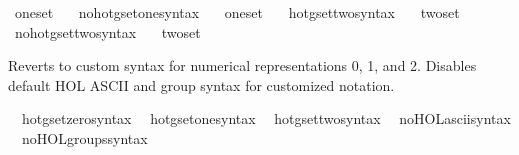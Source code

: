 \begin{isabellebody}
\ one{\isacharunderscore}{\kern0pt}set\ {\isacharparenleft}{\kern0pt}{\isachardoublequoteopen}{}{\isachardoublequoteclose}{\isacharparenright}{\kern0pt}\ \isamarkupfalse%
\isanewline
{}\isamarkupfalse%
\ no{\isacharunderscore}{\kern0pt}hotg{\isacharunderscore}{\kern0pt}set{\isacharunderscore}{\kern0pt}one{\isacharunderscore}{\kern0pt}syntax\ \ \isamarkupfalse%
\ one{\isacharunderscore}{\kern0pt}set\ {\isacharparenleft}{\kern0pt}{\isachardoublequoteopen}{}{\isachardoublequoteclose}{\isacharparenright}{\kern0pt}\ \isamarkupfalse%
\isanewline
\isanewline
{}\isamarkupfalse%
\ hotg{\isacharunderscore}{\kern0pt}set{\isacharunderscore}{\kern0pt}two{\isacharunderscore}{\kern0pt}syntax\ \ \isamarkupfalse%
\ two{\isacharunderscore}{\kern0pt}set\ {\isacharparenleft}{\kern0pt}{\isachardoublequoteopen}{}{\isachardoublequoteclose}{\isacharparenright}{\kern0pt}\ \isamarkupfalse%
\isanewline
{}\isamarkupfalse%
\ no{\isacharunderscore}{\kern0pt}hotg{\isacharunderscore}{\kern0pt}set{\isacharunderscore}{\kern0pt}two{\isacharunderscore}{\kern0pt}syntax\ \ \isamarkupfalse%
\ two{\isacharunderscore}{\kern0pt}set\ {\isacharparenleft}{\kern0pt}{\isachardoublequoteopen}{}{\isachardoublequoteclose}{\isacharparenright}{\kern0pt}\ \isamarkupfalse%
%
\begin{isamarkuptext}%
Reverts to custom syntax for numerical representations 0, 1, and 2.
      Disables default HOL ASCII and group syntax for customized notation.%
\end{isamarkuptext}\isamarkuptrue%
\isamarkupfalse%
\isanewline
\ \ hotg{\isacharunderscore}{\kern0pt}set{\isacharunderscore}{\kern0pt}zero{\isacharunderscore}{\kern0pt}syntax\isanewline
\ \ hotg{\isacharunderscore}{\kern0pt}set{\isacharunderscore}{\kern0pt}one{\isacharunderscore}{\kern0pt}syntax\isanewline
\ \ hotg{\isacharunderscore}{\kern0pt}set{\isacharunderscore}{\kern0pt}two{\isacharunderscore}{\kern0pt}syntax\isanewline
{}\isamarkupfalse%
\isanewline
\ \ no{\isacharunderscore}{\kern0pt}HOL{\isacharunderscore}{\kern0pt}ascii{\isacharunderscore}{\kern0pt}syntax\isanewline
\ \ no{\isacharunderscore}{\kern0pt}HOL{\isacharunderscore}{\kern0pt}groups{\isacharunderscore}{\kern0pt}syntax%
\isadelimdocument
%
\endisadelimdocument

\end{isabellebody}
